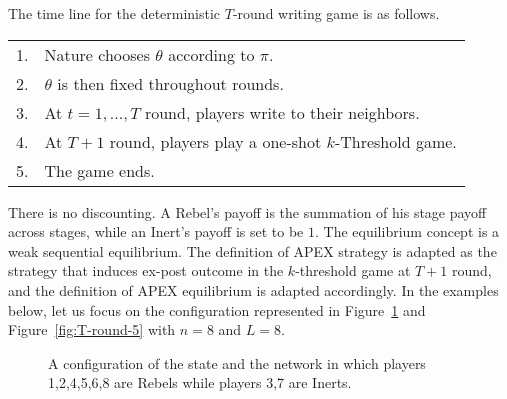 \documentclass[12pt,letter]{article}
\theoremstyle{definition}
\theoremstyle{remark}
\theoremstyle{claim}
\begin{document}
The time line for the deterministic $T$-round writing game is as follows.
\begin{table}[!htbp]
\begin{center}
\begin{tabular}{ll }
1.  & Nature chooses $\theta$ according to $\pi$. \\
2. & $\theta$ is then fixed throughout rounds.\\
3. & At $t=1,...,T$ round, players write to their neighbors. \\
4. & At $T+1$ round, players play a one-shot $k$-Threshold game.\\
5. & The game ends.
\end{tabular}
\end{center}
\end{table}
There is no discounting. A Rebel's payoff is the summation of his stage payoff across stages, while an Inert's payoff is set to be $1$. The equilibrium concept is a weak sequential equilibrium. The definition of APEX strategy is adapted as the strategy that induces ex-post outcome in the $k$-threshold game at $T+1$ round, and the definition of APEX equilibrium is adapted accordingly. In the examples below, let us focus on the configuration represented in Figure~\ref{fig:T-round-6} and Figure~\ref{fig:T-round-5} with $n=8$ and $L=8$. 

\begin{figure}

\begin{center}
\end{center}
\caption{A configuration of the state and the network in which players 1,2,4,5,6,8 are Rebels while players 3,7 are Inerts.}
\label{fig:T-round-6}
\end{figure}
\end{document}
